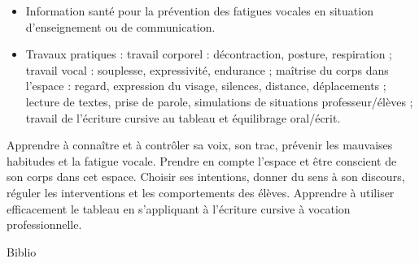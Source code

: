 \documentclass[10pt, a5paper]{report}
\begin{document}
\module[codeApogee={UEL},
titre={Maîtriser sa voix, son corps, l’espace et le tableau pour enseigner et communiquer}, 
COURS={}, 
TD={20}, 
TP={}, 
CTD={},
CTP={}, 
TOTAL={20}, 
SEMESTRE={Semestre 6}, 
COEFF={3}, 
ECTS={3}, 
ModalitesCCSemestreUn={Cf. modalités de contrôle de connaissances des UE Libres}, 
ModalitesCCSemestreDeux={Cf. modalités de contrôle de connaissances des UE Libres}, 
NoteEliminatoire={}, 
nomPremierResp={Pascal Fremault}, 
emailPremierResp={pascal.fremault@univ-orleans.fr}, 
nomSecondResp={}, 
emailSecondResp={}, 
langue={Français}, 
nbPrerequis={0}, 
descriptionCourte={false}, 
descriptionLongue={true}, 
objectifs={true}, 
ressources={false}, 
bibliographie={false}] 
{
} 
{
\begin{itemize}
\item Information santé pour la prévention des fatigues vocales en situation d’enseignement ou de communication.
\item Travaux pratiques :
 \subitem travail corporel : décontraction, posture, respiration ; travail vocal : souplesse, expressivité, endurance ;
 \subitem maîtrise du corps dans l'espace : regard, expression du visage, silences, distance, déplacements ;
 \subitem lecture de textes, prise de parole, simulations de situations professeur/élèves ;
 \subitem travail de l’écriture cursive au tableau et équilibrage oral/écrit.
\end{itemize}} 
{
} 
{\begin{itemize} 
  \ObjItem Apprendre à connaître et à contrôler sa voix, son trac, prévenir les mauvaises habitudes et la fatigue vocale. Prendre en compte l'espace et être conscient de son corps dans cet espace. Choisir ses intentions, donner du sens à son discours, réguler les interventions et les comportements des élèves. Apprendre à utiliser efficacement le tableau en s’appliquant à l’écriture cursive à vocation professionnelle.
\end{itemize} 
} 
{} 
{Biblio}
\vfill
\end{document}
